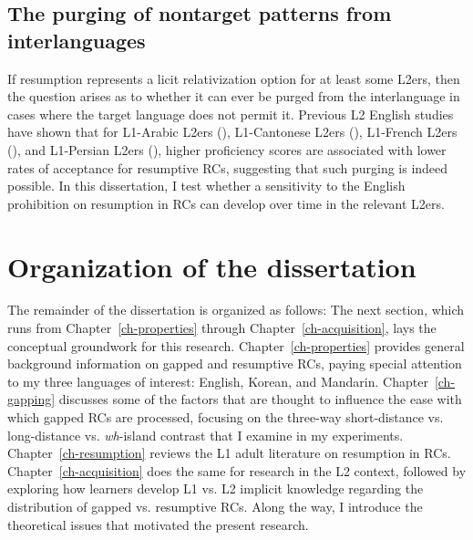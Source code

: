 \subsection{The purging of nontarget patterns from interlanguages}

If resumption represents a licit relativization option for at least some L2ers, then the question arises as to whether it can ever be purged from the interlanguage in cases where the target language does not permit it. Previous L2 English studies have shown that for L1-Arabic L2ers (\cite{alosaimi2021,maghrabi1997}), L1-Cantonese L2ers (\cite{hawkins.chan1997}), L1-French L2ers (\cite{hawkins.chan1997,solaimani.etal2023}), and L1-Persian L2ers (\cite{marefat.abdollahnejad2014,solaimani.etal2023}), higher proficiency scores are associated with lower rates of acceptance for resumptive RCs, suggesting that such purging is indeed possible. In this dissertation, I test whether a sensitivity to the English prohibition on resumption in RCs can develop over time in the relevant L2ers.

\section{Organization of the dissertation}

The remainder of the dissertation is organized as follows: The next section, which runs from Chapter~\ref{ch-properties} through Chapter~\ref{ch-acquisition}, lays the conceptual groundwork for this research. Chapter~\ref{ch-properties} provides general background information on gapped and resumptive RCs, paying special attention to my three languages of interest: English, Korean, and Mandarin. Chapter~\ref{ch-gapping} discusses some of the factors that are thought to influence the ease with which gapped RCs are processed, focusing on the three-way short-distance vs. long-distance vs. \textit{wh}-island contrast that I examine in my experiments. Chapter~\ref{ch-resumption} reviews the L1 adult literature on resumption in RCs. Chapter~\ref{ch-acquisition} does the same for research in the L2 context, followed by exploring how learners develop L1 vs. L2 implicit knowledge regarding the distribution of gapped vs. resumptive RCs. Along the way, I introduce the theoretical issues that motivated the present research.

